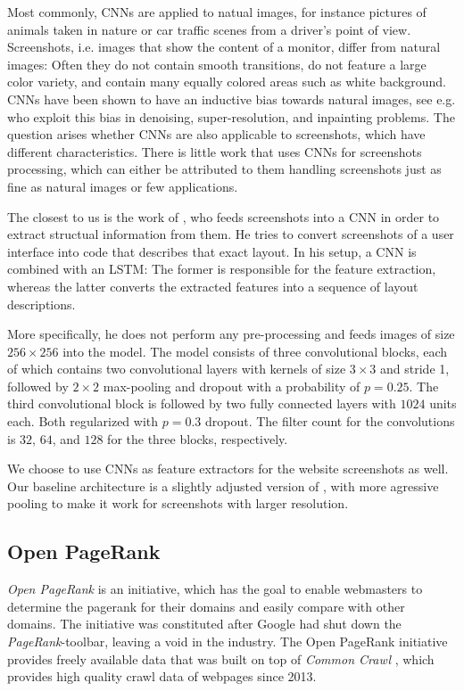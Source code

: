 Most commonly, CNNs are applied to natual images, for instance pictures of animals taken in nature or car traffic scenes from a driver's point of view. Screenshots, i.e. images that show the content of a monitor, differ from natural images: Often they do not contain smooth transitions, do not feature a large color variety, and contain many equally colored areas such as white background. CNNs have been shown to have an inductive bias towards natural images, see e.g. \cite{deepimageprior} who exploit this bias in denoising, super-resolution, and inpainting problems. The question arises whether CNNs are also applicable to screenshots, which have different characteristics. There is little work that uses CNNs for screenshots processing, which can either be attributed to them handling screenshots just as fine as natural images or few applications.

The closest to us is the work of \cite{beltramelli:pix2code}, who feeds screenshots into a CNN in order to extract structual information from them. He tries to convert screenshots of a user interface into code that describes that exact layout. In his setup, a CNN is combined with an LSTM: The former is responsible for the feature extraction, whereas the latter converts the extracted features into a sequence of layout descriptions.

More specifically, he does not perform any pre-processing and feeds images of size $256\times 256$ into the model. The model consists of three convolutional blocks, each of which contains two convolutional layers with kernels of size $3\times 3$ and stride 1, followed by $2\times 2$ max-pooling and dropout with a probability of $p=0.25$. The third convolutional block is followed by two fully connected layers with $1024$ units each. Both regularized with $p=0.3$ dropout. The filter count for the convolutions is $32$, $64$, and $128$ for the three blocks, respectively.

We choose to use CNNs as feature extractors for the website screenshots as well. Our baseline architecture is a slightly adjusted version of \cite{beltramelli:pix2code}, with more agressive pooling to make it work for screenshots with larger resolution.

\subsection{Open PageRank}
\label{OpenPageRank}
\textit{Open PageRank} \cite{OpenPageRank} is an initiative, which has the goal to enable webmasters to determine the pagerank for their domains and easily compare with other domains. The initiative was constituted after Google had shut down the \textit{PageRank}-toolbar, leaving a void in the industry. The Open PageRank initiative provides freely available data that was built on top of \textit{Common Crawl} \cite{CommonCrawl}, which provides high quality crawl data of webpages since 2013.

